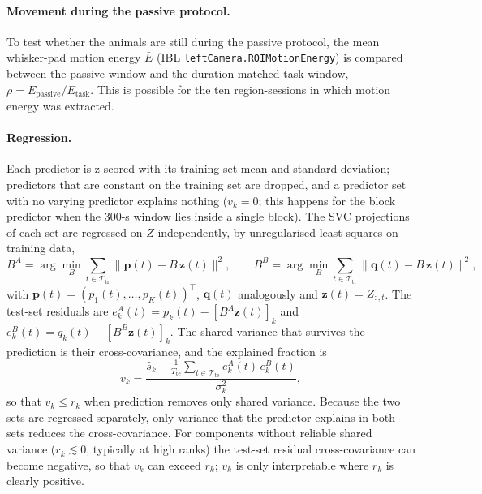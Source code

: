 \documentclass[11pt]{article}
\begin{document}
\paragraph{Movement during the passive protocol.} To test whether the animals are still during the passive protocol, the mean whisker-pad motion energy $\bar{E}$ (IBL \texttt{leftCamera.ROIMotionEnergy}) is compared between the passive window and the duration-matched task window, $\rho = \bar{E}_{\mathrm{passive}} / \bar{E}_{\mathrm{task}}$. This is possible for the ten region-sessions in which motion energy was extracted.

\paragraph{Regression.} Each predictor is z-scored with its training-set mean and standard deviation; predictors that are constant on the training set are dropped, and a predictor set with no varying predictor explains nothing ($v_k = 0$; this happens for the block predictor when the 300-s window lies inside a single block). The SVC projections of each set are regressed on $Z$ independently, by unregularised least squares on training data,
\begin{equation}
  B^{A} = \arg\min_{B} \sum_{t \in \mathcal{T}_{\mathrm{tr}}} \big\| \mathbf{p}(t) - B\, \mathbf{z}(t) \big\|^2, \qquad
  B^{B} = \arg\min_{B} \sum_{t \in \mathcal{T}_{\mathrm{tr}}} \big\| \mathbf{q}(t) - B\, \mathbf{z}(t) \big\|^2,
\end{equation}
with $\mathbf{p}(t) = (p_1(t), \dots, p_K(t))^{\top}$, $\mathbf{q}(t)$ analogously and $\mathbf{z}(t) = Z_{:,t}$. The test-set residuals are $e^{A}_k(t) = p_k(t) - [B^{A} \mathbf{z}(t)]_k$ and $e^{B}_k(t) = q_k(t) - [B^{B} \mathbf{z}(t)]_k$. The shared variance that survives the prediction is their cross-covariance, and the explained fraction is
\begin{equation}
  v_k = \frac{\hat{s}_k - \frac{1}{T_{\mathrm{te}}} \sum_{t \in \mathcal{T}_{\mathrm{te}}} e^{A}_k(t)\, e^{B}_k(t)}{\sigma_k^2},
\end{equation}
so that $v_k \le r_k$ when prediction removes only shared variance. Because the two sets are regressed separately, only variance that the predictor explains in both sets reduces the cross-covariance. For components without reliable shared variance ($r_k \lesssim 0$, typically at high ranks) the test-set residual cross-covariance can become negative, so that $v_k$ can exceed $r_k$; $v_k$ is only interpretable where $r_k$ is clearly positive.
\end{document}
